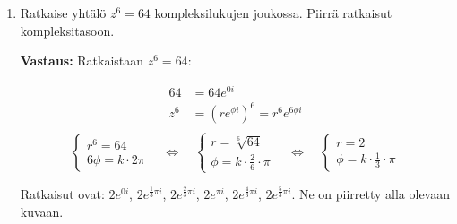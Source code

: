 \documentclass[a4paper,12pt]{article}
\begin{document}
 

\otsikko

\begin{enumerate}

\item Ratkaise yht\"al\"o $z^6=64$ kompleksilukujen joukossa. Piirr\"a ratkaisut kompleksitasoon.

\textbf{Vastaus:} Ratkaistaan $z^6=64$:

\begin{align*}
    64&=64e^{0i}\\
    z^6&=(re^{\phi i})^6 =r^6e^{6\phi i}\\    
\end{align*}
\[
\begin{cases}
    r^6=64 \\
    6\phi = k \cdot 2\pi
\end{cases}
\quad \Longleftrightarrow \quad
\begin{cases}
    r=\sqrt[6]{64} \\
    \phi=k\cdot \frac{2}{6}\cdot \pi 
\end{cases}
\quad \Longleftrightarrow \quad
\begin{cases}
    r=2 \\
    \phi=k\cdot \frac{1}{3}\cdot \pi 
\end{cases}
\]

Ratkaisut ovat: $2e^{0i}$, $2e^{\frac{1}{3}\pi i}$, $2e^{\frac{2}{3}\pi i}$, $2e^{\pi i}$, $2e^{\frac{4}{3}\pi i}$, $2e^{\frac{5}{3}\pi i}$. Ne on piirretty alla olevaan kuvaan.\\

\begin{center}
\end{center}
\end{enumerate}
\end{document}
